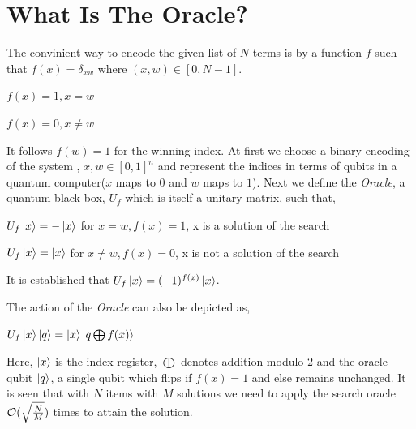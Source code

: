 \documentclass{article}
\begin{document}
\section{What Is The Oracle?}
The convinient way to encode the given list of $N$ terms is by a function $f$ such that $f(x)=\delta_{xw}$ where $(x, w) \in [0, N-1]$. 
\begin{center}
$f(x)=1, x=w$\\ \par
$f(x)=0, x \ne w$
\end{center}
It follows $f(w)=1$ for the winning index. At first we choose a binary encoding of the system , $x, w \in [0, 1]^n$ and represent the indices in terms of qubits in a quantum computer($x$ maps to $0$ and $w$ maps to $1$). Next we define the \textit{Oracle}, a quantum black box, $U_f$ which is itself a unitary matrix, such that,
\begin{center}
$U_f \ket{x}=- \ket{x}$ for $x=w, f(x)=1$, x is a solution of the search\\ \par
$U_f \ket{x}= \ket{x}$ for $x \ne w, f(x)=0$, x is not a solution of the search
\end{center}
It is established that $U_f \ket{x}=(-1)^{f(x)} \ket{x}$. \\ \par
The action of the \textit{Oracle} can also be depicted as, 
\begin{center}
$U_f \ket{x} \ket{q} = \ket{x} \ket{q \bigoplus f(x)}$
\end{center}
Here, $\ket{x}$ is the index register, $\bigoplus$ denotes addition modulo $2$ and the oracle qubit $\ket{q}$, a single qubit which flips if $f(x)=1$ and else remains unchanged. It is seen that with $N$ items with $M$ solutions we need to apply the search oracle $\mathcal{O}(\sqrt{N \over M})$ times to attain the solution.
\end{document}
